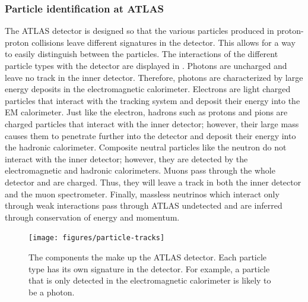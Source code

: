 \subsubsection{Particle identification at ATLAS}
\label{subsubsec:particleid}
The ATLAS detector is designed so that the various particles produced in
proton-proton collisions leave different signatures in the detector. This
allows for a way to easily distinguish between the particles.
The interactions
of the different particle types with the detector are displayed in 
. Photons are uncharged and leave no track in
the inner detector. Therefore, photons are characterized by large energy 
deposits in the electromagnetic calorimeter. Electrons are light charged particles
that interact with the tracking system and deposit their energy into the 
EM calorimeter. Just like the electron, hadrons such as protons and pions 
are charged particles that interact with the inner detector; however, their
large mass causes them to penetrate further into the detector and deposit
their energy into the hadronic calorimeter. Composite neutral particles
like the neutron do not interact with the inner detector; however, they
are detected by the electromagnetic and hadronic calorimeters. Muons
pass through the whole detector and are charged. Thus, they will leave a
track in both the inner detector and the muon spectrometer. Finally,
massless neutrinos which interact only through weak interactions
pass through ATLAS undetected
and are inferred through conservation of energy and momentum.

\begin{figure}[!hbpt]
  \centering
  \texttt{[image: figures/particle-tracks]}
  \caption{The components the make up the ATLAS detector. Each particle type
  has its own signature in the detector. For example, a particle that is
  only detected in the electromagnetic calorimeter is likely to be a photon.
  }
  \label{fig:particleid}
\end{figure}




